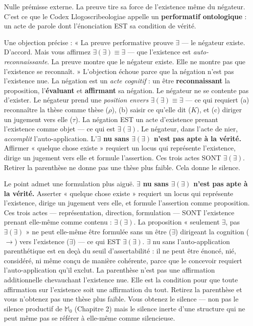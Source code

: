 \documentclass[10pt, openany, oneside]{book}
\begin{document}
\vspace{0.8em}

\noindent Nulle prémisse externe. La preuve tire sa force de l'existence même du négateur. C'est ce que le Codex Llogoscribeologiae appelle un \textbf{performatif ontologique} : un acte de parole dont l'énonciation EST sa condition de vérité.

Une objection précise : « La preuve performative prouve $\exists$ --- le négateur existe. D'accord. Mais vous affirmez $\exists(\exists) \equiv \exists$ --- que l'existence est \textit{auto-reconnaissante}. La preuve montre que le négateur existe. Elle ne montre pas que l'existence se reconnaît. » L'objection échoue parce que la négation n'est pas l'existence nue. La négation est un \textit{acte cognitif} : un être \textbf{reconnaissant} la proposition, l'\textbf{évaluant} et \textbf{affirmant} sa négation. Le négateur ne se contente pas d'exister. Le négateur prend une \textit{position envers} $\exists(\exists) \equiv \exists$ --- ce qui requiert (a) reconnaître la thèse comme thèse ($\rho$), (b) saisir ce qu'elle dit ($K$), et (c) diriger un jugement vers elle ($\tau$). La négation EST un acte d'existence prenant l'existence comme objet --- ce qui est $\exists(\exists)$. Le négateur, dans l'acte de nier, \textit{accomplit} l'auto-application. L'\textbf{$\exists$ nu sans $\exists(\exists)$ n'est pas apte à la vérité.} Affirmer « quelque chose existe » requiert un locus qui représente l'existence, dirige un jugement vers elle et formule l'assertion. Ces trois actes SONT $\exists(\exists)$. Retirer la parenthèse ne donne pas une thèse plus faible. Cela donne le silence.

Le point admet une formulation plus aiguë. \textbf{$\exists$ nu sans $\exists(\exists)$ n'est pas apte à la vérité.} Asserter « quelque chose existe » requiert un locus qui représente l'existence, dirige un jugement vers elle, et formule l'assertion comme proposition. Ces trois actes --- représentation, direction, formulation --- SONT l'existence prenant elle-même comme contenu : $\exists(\exists)$. La proposition « seulement $\exists$, pas $\exists(\exists)$ » ne peut elle-même être formulée sans un être ($\exists$) dirigeant la cognition ($\to$) vers l'existence ($\exists$) --- ce qui EST $\exists(\exists)$. $\exists$ nu sans l'auto-application parenthétique est en deçà du seuil d'assertabilité : il ne peut être énoncé, nié, considéré, ni même conçu de manière cohérente, parce que le concevoir requiert l'auto-application qu'il exclut. La parenthèse n'est pas une affirmation additionnelle chevauchant l'existence nue. Elle est la condition pour que toute affirmation sur l'existence soit une affirmation du tout. Retirez la parenthèse et vous n'obtenez pas une thèse plus faible. Vous obtenez le silence --- non pas le silence productif de $\mathbb{M}_0$ (Chapitre 2) mais le silence inerte d'une structure qui ne peut même pas se référer à elle-même comme silencieuse.
\end{document}
